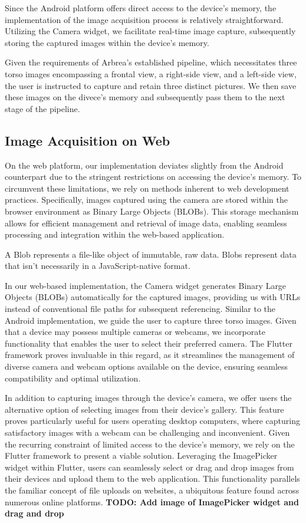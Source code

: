Since the Android platform offers direct access to the device's memory, the implementation of the image acquisition process is relatively straightforward. 
Utilizing the Camera widget, we facilitate real-time image capture, subsequently storing the captured images within the device's memory. 

Given the requirements of Arbrea's established pipeline, 
which necessitates three torso images encompassing a frontal view, a right-side view, and a left-side view, the user is instructed to capture and retain three distinct pictures. 
We then save these images on the divece's memory and subsequently pass them to the next stage of the pipeline.

\subsection{Image Acquisition on Web}

On the web platform, our implementation deviates slightly from the Android counterpart due to the stringent restrictions on accessing the device's memory. 
To circumvent these limitations, we rely on methods inherent to web development practices. Specifically, images captured using the camera are stored within the browser environment as Binary Large Objects (BLOBs). 
This storage mechanism allows for efficient management and retrieval of image data, enabling seamless processing and integration within the web-based application.

A Blob represents a file-like object of immutable, raw data. Blobs represent data that isn't necessarily in a JavaScript-native format. 

In our web-based implementation, the Camera widget generates Binary Large Objects (BLOBs) automatically for the captured images, providing us with URLs instead of conventional file paths for subsequent referencing. 
Similar to the Android implementation, we guide the user to capture three torso images. Given that a device may possess multiple cameras or webcams, we incorporate functionality that enables the user to select their preferred camera. 
The Flutter framework proves invaluable in this regard, as it streamlines the management of diverse camera and webcam options available on the device, ensuring seamless compatibility and optimal utilization.

In addition to capturing images through the device's camera, we offer users the alternative option of selecting images from their device's gallery. This feature proves particularly useful for users operating desktop computers, 
where capturing satisfactory images with a webcam can be challenging and inconvenient. Given the recurring constraint of limited access to the device's memory, we rely on the Flutter framework to present a viable solution. 
Leveraging the ImagePicker widget within Flutter, users can seamlessly select or drag and drop images from their devices and upload them to the web application. This functionality parallels the familiar concept of file uploads on websites, 
a ubiquitous feature found across numerous online platforms. \textbf{TODO: Add image of ImagePicker widget and drag and drop}

